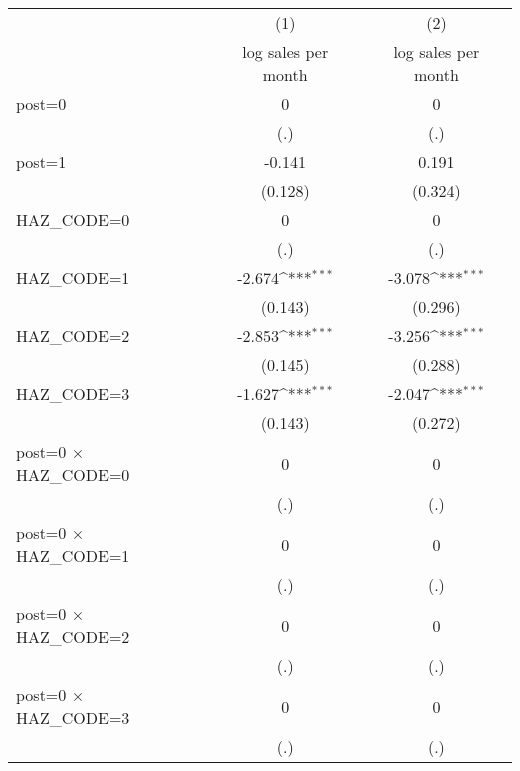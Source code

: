 {
\def\sym#1{\ifmmode^{#1}\else\(^{#1}\)\fi}
\begin{tabular}{l*{2}{c}}
\hline\hline
                    &\multicolumn{1}{c}{(1)}&\multicolumn{1}{c}{(2)}\\
                    &\multicolumn{1}{c}{log sales per month}&\multicolumn{1}{c}{log sales per month}\\
\hline
post=0              &           0         &           0         \\
                    &         (.)         &         (.)         \\
[1em]
post=1              &      -0.141         &       0.191         \\
                    &     (0.128)         &     (0.324)         \\
[1em]
HAZ\_CODE=0          &           0         &           0         \\
                    &         (.)         &         (.)         \\
[1em]
HAZ\_CODE=1          &      -2.674\sym{***}&      -3.078\sym{***}\\
                    &     (0.143)         &     (0.296)         \\
[1em]
HAZ\_CODE=2          &      -2.853\sym{***}&      -3.256\sym{***}\\
                    &     (0.145)         &     (0.288)         \\
[1em]
HAZ\_CODE=3          &      -1.627\sym{***}&      -2.047\sym{***}\\
                    &     (0.143)         &     (0.272)         \\
[1em]
post=0 $\times$ HAZ\_CODE=0&           0         &           0         \\
                    &         (.)         &         (.)         \\
[1em]
post=0 $\times$ HAZ\_CODE=1&           0         &           0         \\
                    &         (.)         &         (.)         \\
[1em]
post=0 $\times$ HAZ\_CODE=2&           0         &           0         \\
                    &         (.)         &         (.)         \\
[1em]
post=0 $\times$ HAZ\_CODE=3&           0         &           0         \\
                    &         (.)         &         (.)         \\

\end{tabular}}
